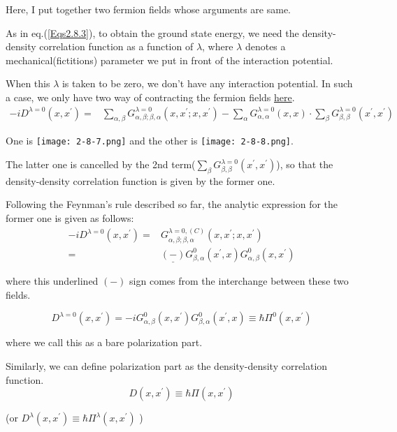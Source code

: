 Here, I put together two fermion fields whose arguments are same.

As in eq.(\ref{Eqs2.8.3}), to obtain the ground state energy, we need the density-density correlation function as a function of $\lambda$, where $\lambda$ denotes a mechanical(fictitions) parameter we put in front of the interaction potential.

When this $\lambda$ is taken to be zero, we don't have any interaction potential. In such a case, we only have two way of contracting the fermion fields \underline{here}.
\[\begin{split}
-i D^{\lambda=0}(x,x^{'})=& \sum_{\alpha,\beta} G^{\lambda=0}_{\alpha,\beta;\beta,\alpha}(x,x^{'};x,x^{'}) - \sum_{\alpha}G^{\lambda=0}_{\alpha,\alpha}(x,x)\cdot\sum_{\beta}G^{\lambda=0}_{\beta,\beta}(x^{'},x^{'})
\end{split}\]

One is {\label{Fig2.8.7} \texttt{[image: 2-8-7.png]}} and the other is {\label{Fig2.8.8} \texttt{[image: 2-8-8.png]}}.

The latter one is cancelled by the 2nd term($\sum_{\beta} G^{\lambda=0}_{\beta,\beta}(x^{'},x^{'})$), so that the density-density correlation function is given by the former one.

Following the Feynman's rule described so far, the analytic expression for the former one is given as follows:
\[\begin{split}-i D^{\lambda=0}(x,x^{'})=&G^{\lambda=0,(C)}_{\alpha,\beta;\beta,\alpha}(x,x^{'};x,x^{'})\\
=& \underline{(-)} G^0_{\beta,\alpha}(x^{'},x) G^0_{\alpha,\beta}(x,x^{'})\end{split}\]

where this underlined $(-)$ sign comes from the interchange between these two fields.

\[D^{\lambda=0}(x,x^{'})=-i G^0_{\alpha,\beta}(x,x^{'}) G^0_{\beta,\alpha}(x^{'},x) \equiv \hbar \Pi^0(x,x^{'})\]

where we call this as a bare polarization part.

Similarly, we can define polarization part as the density-density correlation function.
\begin{equation*} \label{Eqs2.8.4'} \tag{2.8.4'}
D(x,x^{'}) \equiv \hbar \Pi(x,x^{'})
\end{equation*}

(or $D^{\lambda}(x,x^{'}) \equiv \hbar \Pi^{\lambda}(x,x^{'})$ )

